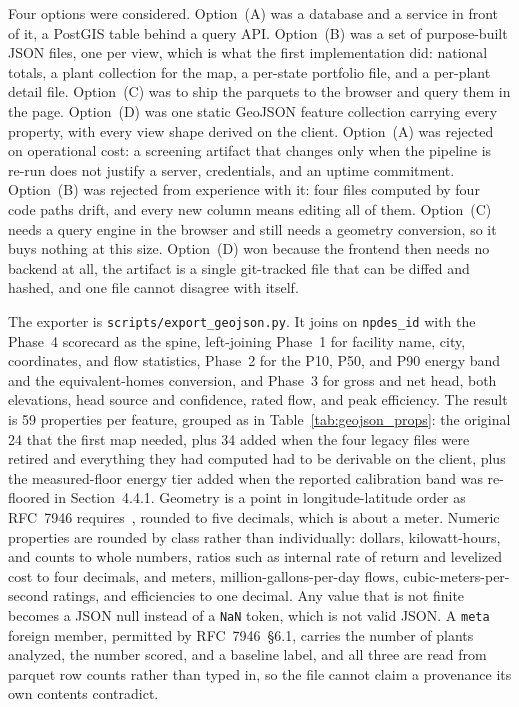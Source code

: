 \documentclass[12pt,letterpaper]{report}
\begin{document}
Four options were considered. Option~(A) was a database and a service in front of
it, a PostGIS table behind a query API. Option~(B) was a set of purpose-built JSON
files, one per view, which is what the first implementation did: national totals,
a plant collection for the map, a per-state portfolio file, and a per-plant detail
file. Option~(C) was to ship the parquets to the browser and query them in the
page. Option~(D) was one static GeoJSON feature collection carrying every
property, with every view shape derived on the client. Option~(A) was rejected on
operational cost: a screening artifact that changes only when the pipeline is
re-run does not justify a server, credentials, and an uptime commitment. Option~(B)
was rejected from experience with it: four files computed by four code paths
drift, and every new column means editing all of them. Option~(C) needs a query
engine in the browser and still needs a geometry conversion, so it buys nothing at
this size. Option~(D) won because the frontend then needs no backend at all, the
artifact is a single git-tracked file that can be diffed and hashed, and one file
cannot disagree with itself.

The exporter is \texttt{scripts/export\_geojson.py}. It joins on \texttt{npdes\_id}
with the Phase~4 scorecard as the spine, left-joining Phase~1 for facility name,
city, coordinates, and flow statistics, Phase~2 for the P10, P50, and P90 energy
band and the equivalent-homes conversion, and Phase~3 for gross and net head, both
elevations, head source and confidence, rated flow, and peak efficiency. The result
is 59 properties per feature, grouped as in Table~\ref{tab:geojson_props}: the
original 24 that the first map needed, plus 34 added when the four legacy files
were retired and everything they had computed had to be derivable on the client,
plus the measured-floor energy tier added when the reported calibration band was
re-floored in Section~4.4.1.
Geometry is a point in longitude-latitude order as RFC~7946 requires~\cite{rfc7946},
rounded to five decimals, which is about a meter. Numeric properties are rounded by
class rather than individually: dollars, kilowatt-hours, and counts to whole
numbers, ratios such as internal rate of return and levelized cost to four
decimals, and meters, million-gallons-per-day flows, cubic-meters-per-second
ratings, and efficiencies to one decimal. Any value that is not finite becomes a
JSON null instead of a \texttt{NaN} token, which is not valid JSON. A \texttt{meta}
foreign member, permitted by RFC~7946~\S6.1, carries the number of plants analyzed,
the number scored, and a baseline label, and all three are read from parquet row
counts rather than typed in, so the file cannot claim a provenance its own contents
contradict.
\end{document}
